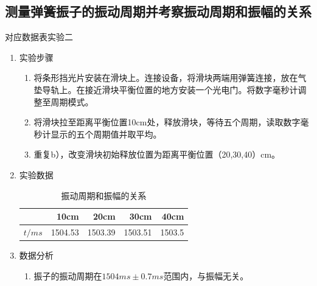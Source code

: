\documentclass[11pt]{article}
\begin{document}
\subsection{测量弹簧振子的振动周期并考察振动周期和振幅的关系}
对应数据表实验二
\begin{enumerate}
    \item 实验步骤
    \begin{enumerate}
        \item 将条形挡光片安装在滑块上。连接设备，将滑块两端用弹簧连接，放在气垫导轨上。在接近滑块平衡位置的地方安装一个光电门。将数字毫秒计调整至周期模式。
        \item 将滑块拉至距离平衡位置10cm处，释放滑块，等待五个周期，读取数字毫秒计显示的五个周期值并取平均。
        \item 重复b），改变滑块初始释放位置为距离平衡位置（20,30,40）cm。
    \end{enumerate}
    \item 实验数据
        \begin{table}[H]
          \centering
          \caption{振动周期和振幅的关系}
            \begin{tabular}{|l|r|r|r|r|}\hline 
                   & 10cm & 20cm & 30cm & 40cm \\\hline
            $t/ms$  & 1504.53 & 1503.39 & 1503.51 & 1503.5 \\\hline
            \end{tabular}%
          \label{tab:addlabel}%
        \end{table}%
    \item 数据分析
    \begin{enumerate}
        \item 振子的振动周期在$1504ms\pm 0.7ms$范围内，与振幅无关。
    \end{enumerate}
\end{enumerate}
\end{document}
